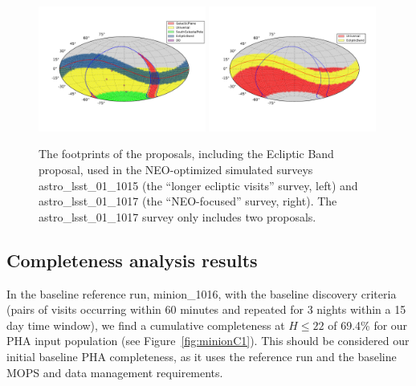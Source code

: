 \begin{figure}[t!]
\centering
\includegraphics[width=0.49\textwidth]{figures/astro_lsst_01_1015_proposal_footprint}
\includegraphics[width=0.49\textwidth]{figures/astro_lsst_01_1017_proposal_footprint}
\vskip -0.5in
\caption{The footprints of the proposals, including the Ecliptic Band proposal, used in the NEO-optimized simulated surveys astro\_lsst\_01\_1015 (the ``longer ecliptic visits'' survey, left) and astro\_lsst\_01\_1017 (the ``NEO-focused'' survey, right). The astro\_lsst\_01\_1017 survey only includes two proposals.
\label{fig:neo_footprints}}
\end{figure}


\subsection{Completeness analysis results}

In the baseline reference run, minion\_1016, with the baseline discovery
criteria (pairs of visits occurring within 60 minutes and
repeated for 3 nights within a 15 day time window), we find a cumulative
completeness at $H\le22$ of 69.4\% for our PHA input population (see
Figure~\ref{fig:minionC1}). This should be considered our initial baseline PHA
completeness, as it uses the reference run and the baseline MOPS and data
management requirements.

